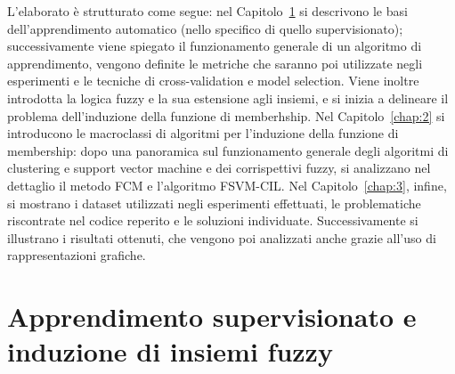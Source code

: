 \documentclass[oneside, openany]{book}
\begin{document}
		L'elaborato è strutturato come segue: nel Capitolo~\ref{chap:1} si descrivono le basi dell'apprendimento automatico (nello specifico di quello supervisionato); successivamente viene spiegato il funzionamento generale di un algoritmo di apprendimento, vengono definite le metriche che saranno poi utilizzate negli esperimenti e le tecniche di cross-validation e model selection. Viene inoltre introdotta la logica fuzzy e la sua estensione agli insiemi, e si inizia a delineare il problema dell'induzione della funzione di memberhship. Nel Capitolo~\ref{chap:2} si introducono le macroclassi di algoritmi per l'induzione della funzione di membership: dopo una panoramica sul funzionamento generale degli algoritmi di clustering e support vector machine e dei corrispettivi fuzzy, si analizzano nel dettaglio il metodo FCM e l'algoritmo FSVM-CIL. Nel Capitolo~\ref{chap:3}, infine, si mostrano i dataset utilizzati negli esperimenti effettuati, le problematiche riscontrate nel codice reperito e le soluzioni individuate. Successivamente si illustrano i risultati ottenuti, che vengono poi analizzati anche grazie all'uso di rappresentazioni grafiche.
		
	\chapter[Apprendimento supervisionato]{Apprendimento supervisionato e induzione di insiemi fuzzy}
	\label{chap:1}
\end{document}
